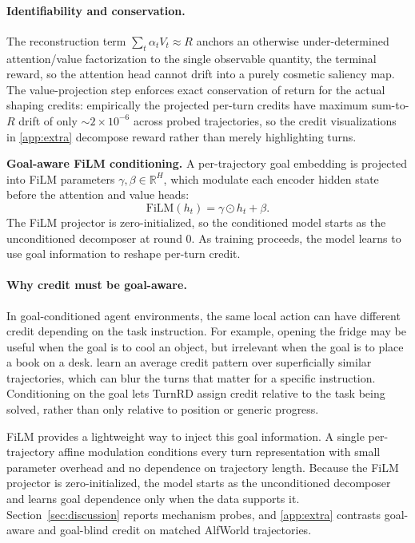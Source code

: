 \documentclass{article}
\begin{document}
\paragraph{Identifiability and conservation.}
The reconstruction term $\sum_t \alpha_t V_t \approx R$ anchors an otherwise under-determined
attention/value factorization to the single observable quantity, the terminal reward, so the
attention head cannot drift into a purely cosmetic saliency map. The value-projection step
enforces exact conservation of return for the actual shaping credits: empirically the projected
per-turn credits have maximum sum-to-$R$ drift of only ${\sim}2\times10^{-6}$ across probed
trajectories, so the credit visualizations in \ref{app:extra} decompose reward rather than
merely highlighting turns.

\textbf{Goal-aware FiLM conditioning.} A per-trajectory goal embedding is projected into FiLM
parameters $\gamma,\beta \in \mathbb{R}^{H}$, which modulate each encoder hidden state before
the attention and value heads:
\begin{equation}
\mathrm{FiLM}(h_t) = \gamma \odot h_t + \beta.
\end{equation}
The FiLM projector is zero-initialized, so the conditioned model starts as the unconditioned
decomposer at round 0. As training proceeds, the model learns to use goal information to
reshape per-turn credit.

\paragraph{Why credit must be goal-aware.}
In goal-conditioned agent environments, the same local action can have different credit
depending on the task instruction. For example, opening the fridge may be useful when the goal
is to cool an object, but irrelevant when the goal is to place a book on a desk.
learn an average credit pattern over superficially similar trajectories, which can blur the
turns that matter for a specific instruction. Conditioning on the goal lets TurnRD assign
credit relative to the task being solved, rather than only relative to position or generic
progress.

FiLM provides a lightweight way to inject this goal information. A single per-trajectory affine
modulation conditions every turn representation with small parameter overhead and no dependence
on trajectory length. Because the FiLM projector is zero-initialized, the model starts as the
unconditioned decomposer and learns goal dependence only when the data supports it.
Section~\ref{sec:discussion} reports mechanism probes, and \ref{app:extra} contrasts
goal-aware and goal-blind credit on matched AlfWorld trajectories.
\end{document}
